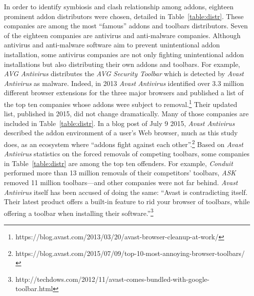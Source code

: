 \documentclass[10pt,letterpaper]{article}
\begin{document}
In order to identify symbiosis and clash relationship among addons, eighteen prominent addon distributors were chosen, detailed in Table~\ref{table:distr}. These companies are among the most ``famous'' addons and toolbars distributors. Seven of the eighteen companies are antivirus and anti-malware companies. Although antivirus and anti-malware software aim to prevent unintentional addon installation, some antivirus companies are not only fighting unintentional addon installations but also distributing their own addons and toolbars. For example, \textit{AVG Antivirus} distributes the \textit{AVG Security Toolbar} which is detected by \textit{Avast Antivirus} as malware. Indeed, in 2013 \textit{Avast} \textit{Antivirus} identified over 3.3 million different browser extensions for the three major browsers and published a list of the top ten companies whose addons were subject to removal.\footnote{ https://blog.avast.com/2013/03/20/avast-browser-cleanup-at-work/} Their updated list, published in 2015, did not change dramatically. Many of those companies are included in Table~\ref{table:distr}. In a blog post of July 9 2015, \textit{Avast Antivirus} described the addon environment of a user's Web browser, much as this study does, as an ecosystem where ``addons fight against each other''.\footnote{ https://blog.avast.com/2015/07/09/top-10-most-annoying-browser-toolbars/} Based on \textit{Avast Antivirus} statistics on the forced removals of competing toolbars, some companies in Table~\ref{table:distr} are among the top ten offenders. For example, \textit{Conduit} performed more than 13 million removals of their competitors' toolbars, \textit{ASK }removed 11 million toolbars---and other companies were not far behind. \textit{Avast Antivirus} itself has been accused of doing the same: ``Avast is contradicting itself. Their latest product offers a built-in feature to rid your browser of toolbars, while offering a toolbar when installing their software.''\footnote{ http://techdows.com/2012/11/avast-comes-bundled-with-google-toolbar.html}
\end{document}
